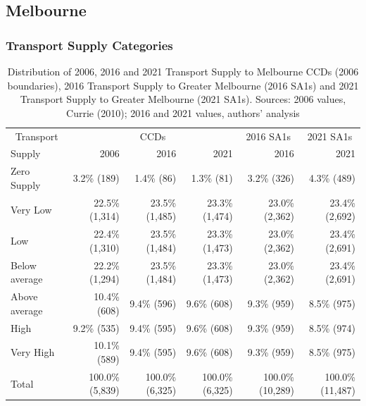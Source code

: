 \documentclass[preprint, 3p,
authoryear]{elsarticle} %
\begin{document}
\subsection{Melbourne}\label{melbourne}

\subsubsection{Transport Supply
Categories}\label{transport-supply-categories}

\begin{table}

\caption{\label{tab:Greater_Melbourne_CCDs_SA1_table}Distribution of 2006, 2016 and 2021 Transport Supply to Melbourne CCDs (2006 boundaries), 2016 Transport Supply to Greater Melbourne (2016 SA1s) and 2021 Transport Supply to Greater Melbourne (2021 SA1s). Sources: 2006 values, Currie (2010); 2016 and 2021 values, authors' analysis}
\centering
\begin{tabular}[t]{l|r|r|r|r|r}
\hline
\multicolumn{1}{c|}{Transport} & \multicolumn{3}{c|}{CCDs} & \multicolumn{1}{c|}{2016 SA1s} & \multicolumn{1}{c}{2021 SA1s} \\
\cline{1-1} \cline{2-4} \cline{5-5} \cline{6-6}
Supply & 2006 & 2016 & 2021 & 2016 & 2021\\
\hline
Zero Supply & 3.2\%   (189) & 1.4\%    (86) & 1.3\%    (81) & 3.2\%    (326) & 4.3\%    (489)\\
\hline
Very Low & 22.5\% (1,314) & 23.5\% (1,485) & 23.3\% (1,474) & 23.0\%  (2,362) & 23.4\%  (2,692)\\
\hline
Low & 22.4\% (1,310) & 23.5\% (1,484) & 23.3\% (1,473) & 23.0\%  (2,362) & 23.4\%  (2,691)\\
\hline
Below average & 22.2\% (1,294) & 23.5\% (1,484) & 23.3\% (1,473) & 23.0\%  (2,362) & 23.4\%  (2,691)\\
\hline
Above average & 10.4\%   (608) & 9.4\%   (596) & 9.6\%   (608) & 9.3\%    (959) & 8.5\%    (975)\\
\hline
High & 9.2\%   (535) & 9.4\%   (595) & 9.6\%   (608) & 9.3\%    (959) & 8.5\%    (974)\\
\hline
Very High & 10.1\%   (589) & 9.4\%   (595) & 9.6\%   (608) & 9.3\%    (959) & 8.5\%    (975)\\
\hline
Total & 100.0\% (5,839) & 100.0\% (6,325) & 100.0\% (6,325) & 100.0\% (10,289) & 100.0\% (11,487)\\
\hline
\end{tabular}
\end{table}
\end{document}
